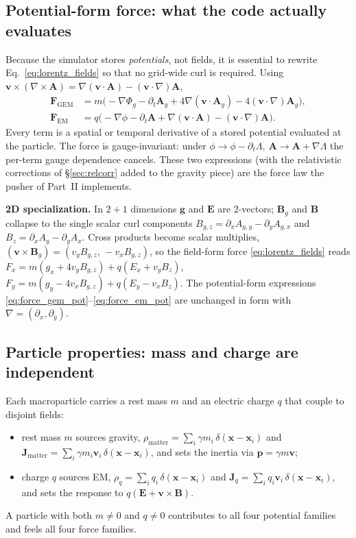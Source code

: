 \documentclass[11pt]{article}
\newcommand{\Phig}{\Phi_g}                 %
\newcommand{\Ag}{\mathbf{A}_g}             %
\newcommand{\vv}[1]{\mathbf{#1}}           %
\newcommand{\Bg}{\vv{B}_g}
\begin{document}
\subsection{Potential-form force: what the code actually evaluates}
\label{sec:force_potential}

Because the simulator stores \emph{potentials}, not fields, it is essential to
rewrite Eq.~\eqref{eq:lorentz_fields} so that no grid-wide curl is required.
Using $\vv{v}\times(\nabla\times\vv{A}) = \nabla(\vv{v}\cdot\vv{A}) -
(\vv{v}\cdot\nabla)\vv{A}$,
\begin{align}
  \vv{F}_{\mathrm{GEM}} &= m\bigl(-\nabla\Phig - \partial_t\Ag
     + 4\nabla(\vv{v}\cdot\Ag) - 4(\vv{v}\cdot\nabla)\Ag\bigr),
     \label{eq:force_gem_pot}\\
  \vv{F}_{\mathrm{EM}}  &= q\bigl(-\nabla\phi - \partial_t\vv{A}
     + \nabla(\vv{v}\cdot\vv{A}) - (\vv{v}\cdot\nabla)\vv{A}\bigr).
     \label{eq:force_em_pot}
\end{align}
Every term is a spatial or temporal derivative of a stored potential evaluated
at the particle. The force is gauge-invariant: under
$\phi\to\phi-\partial_t\Lambda,\ \vv{A}\to\vv{A}+\nabla\Lambda$ the per-term
gauge dependence cancels. These two expressions (with the relativistic
corrections of \S\ref{sec:relcorr} added to the gravity piece) are the force law
the pusher of Part~II implements.

\begin{twoD}
\textbf{2D specialization.} In $2{+}1$ dimensions $\vv{g}$ and $\vv{E}$ are
2-vectors; $\Bg$ and $\vv{B}$ collapse to the single scalar curl components
$B_{g,z}=\partial_x A_{g,y}-\partial_y A_{g,x}$ and
$B_z=\partial_x A_y-\partial_y A_x$. Cross products become scalar multiplies,
$(\vv{v}\times\Bg)=(v_y B_{g,z},\,-v_x B_{g,z})$, so the field-form force
\eqref{eq:lorentz_fields} reads
$F_x = m(g_x+4v_yB_{g,z})+q(E_x+v_yB_z)$,
$F_y = m(g_y-4v_xB_{g,z})+q(E_y-v_xB_z)$.
The potential-form expressions \eqref{eq:force_gem_pot}--\eqref{eq:force_em_pot}
are unchanged in form with $\nabla=(\partial_x,\partial_y)$.
\end{twoD}

\subsection{Particle properties: mass and charge are independent}

Each macroparticle carries a rest mass $m$ and an electric charge $q$ that
couple to disjoint fields:
\begin{itemize}
  \item rest mass $m$ sources gravity, $\rho_{\mathrm{matter}}=\sum_i\gamma
  m_i\,\delta(\vv{x}-\vv{x}_i)$ and $\vv{J}_{\mathrm{matter}}=\sum_i\gamma
  m_i\vv{v}_i\,\delta(\vv{x}-\vv{x}_i)$, and sets the inertia via
  $\vv{p}=\gamma m\vv{v}$;
  \item charge $q$ sources EM, $\rho_q=\sum_i q_i\,\delta(\vv{x}-\vv{x}_i)$ and
  $\vv{J}_q=\sum_i q_i\vv{v}_i\,\delta(\vv{x}-\vv{x}_i)$, and sets the response
  to $q(\vv{E}+\vv{v}\times\vv{B})$.
\end{itemize}
A particle with both $m\neq0$ and $q\neq0$ contributes to all four potential
families and feels all four force families.
\end{document}
